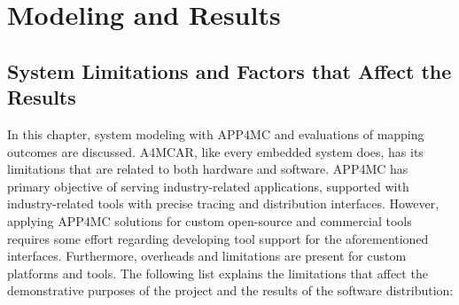 \section{Modeling and Results}
\subsection{System Limitations and Factors that Affect the Results} %
In this chapter, system modeling with APP4MC and evaluations of mapping outcomes are discussed. A4MCAR, like every embedded system does, has its limitations that are related to both hardware and software. APP4MC has primary objective of serving industry-related applications, supported with industry-related tools with precise tracing and distribution interfaces. However, applying APP4MC solutions for custom open-source and commercial tools requires some effort regarding developing tool support for the aforementioned interfaces. Furthermore, overheads and limitations are present for custom platforms and tools. The following list explains the limitations that affect the demonstrative purposes of the project and the results of the software distribution:
